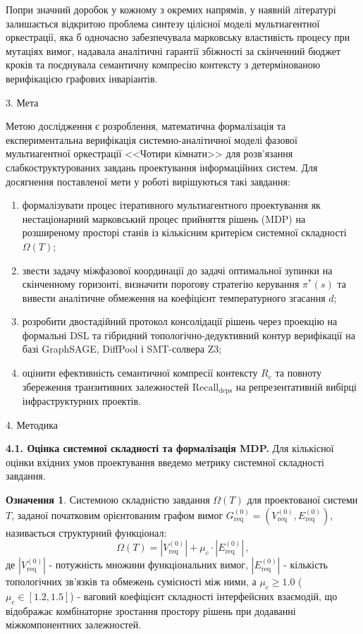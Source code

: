 \documentclass[12pt, reqno, a4paper]{amsart}
\theoremstyle{definition}
\newtheorem{defin}{Означення}
\theoremstyle{plain}
\theoremstyle{plain}
\theoremstyle{plain}
\theoremstyle{remark}
\theoremstyle{plain}
\begin{document}
{Попри значний доробок у кожному з окремих напрямів, у наявній літературі залишається відкритою проблема синтезу цілісної моделі мультиагентної оркестрації, яка б одночасно забезпечувала марковську властивість процесу при мутаціях вимог, надавала аналітичні гарантії збіжності за скінченний бюджет кроків та поєднувала семантичну компресію контексту з детермінованою верифікацією графових інваріантів.

\begin{Head}
3. Мета
\end{Head}

Метою дослідження є розроблення, математична формалізація та експериментальна верифікація системно-аналітичної моделі фазової мультиагентної оркестрації <<Чотири кімнати>> для розв'язання слабкоструктурованих завдань проектування інформаційних систем. Для досягнення поставленої мети у роботі вирішуються такі завдання:
\begin{enumerate}
\item формалізувати процес ітеративного мультиагентного проектування як нестаціонарний марковський процес прийняття рішень (MDP) на розширеному просторі станів із кількісним критерієм системної складності $\Omega(T)$;
\item звести задачу міжфазової координації до задачі оптимальної зупинки на скінченному горизонті, визначити порогову стратегію керування $\pi^*(s)$ та вивести аналітичне обмеження на коефіцієнт температурного згасання $d$;
\item розробити двостадійний протокол консолідації рішень через проекцію на формальні DSL та гібридний топологічно-дедуктивний контур верифікації на базі GraphSAGE, DiffPool і SMT-солвера Z3;
\item оцінити ефективність семантичної компресії контексту $R_{\text{c}}$ та повноту збереження транзитивних залежностей $\text{Recall}_{\text{deps}}$ на репрезентативній вибірці інфраструктурних проектів.
\end{enumerate}

\begin{Head}
4. Методика
\end{Head}

\textbf{4.1. Оцінка системної складності та формалізація MDP.} Для кількісної оцінки вхідних умов проектування введемо метрику системної складності завдання.

\begin{defin}
\label{def:omega}
Системною складністю завдання $\Omega(T)$ для проектованої системи $T$, заданої початковим орієнтованим графом вимог $G_{\text{req}}^{(0)} = (V_{\text{req}}^{(0)},\allowbreak E_{\text{req}}^{(0)})$, називається структурний функціонал:
\begin{equation}
\label{eq:omega}
\Omega(T) = |V_{\text{req}}^{(0)}| + \mu_c \cdot |E_{\text{req}}^{(0)}|\, ,
\end{equation}
де $|V_{\text{req}}^{(0)}|$ - потужність множини функціональних вимог, $|E_{\text{req}}^{(0)}|$ - кількість топологічних зв'язків та обмежень сумісності між ними, а $\mu_c \ge 1.0$ ($\mu_c \in [1.2, 1.5]$) - ваговий коефіцієнт складності інтерфейсних взаємодій, що відображає комбінаторне зростання простору рішень при додаванні міжкомпонентних залежностей.
\end{defin}

}
\end{document}
